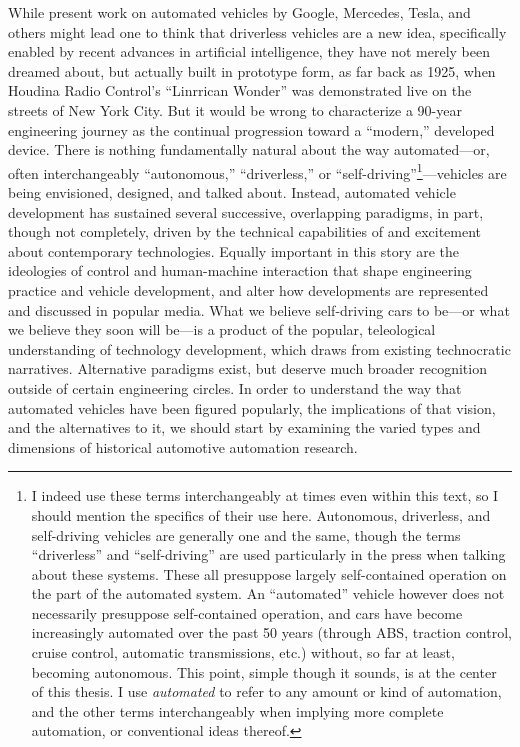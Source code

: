 While present work on automated vehicles by Google, Mercedes, Tesla,
and others might lead one to think that driverless vehicles are a
new idea, specifically enabled by recent advances in artificial
intelligence, they have not merely been dreamed about, but actually
built in prototype form, as far back as 1925, when Houdina Radio
Control's ``Linrrican Wonder'' was demonstrated
live on the streets of New York City. But it would be wrong to
characterize a 90-year engineering journey as the continual
progression toward a ``modern,'' developed device. There is nothing
fundamentally natural about the way automated---or, often interchangeably
``autonomous,'' ``driverless,'' or ``self-driving''\footnote{I indeed use these terms
  interchangeably at times even within this text, so I should mention
the specifics of their use here. Autonomous, driverless, and self-driving
vehicles are generally one and the same, though the terms
``driverless'' and
``self-driving'' are used particularly in the press when talking about
these systems. These all presuppose largely self-contained operation
on the part of the automated system. An ``automated'' vehicle however
does not necessarily presuppose self-contained operation, and cars
have become increasingly automated over the past 50 years (through
ABS, traction control, cruise control, automatic transmissions, etc.) without, so
far at least, becoming autonomous. This point, simple though it
sounds, is at the center of this thesis. I use \emph{automated} to refer to any amount
or kind of automation, and the other terms interchangeably when
implying more complete automation, or conventional ideas thereof.}---vehicles are being
envisioned, designed, and talked about. Instead, automated vehicle
development has sustained several successive, overlapping paradigms,
in part, though not completely, driven by the technical capabilities
of and excitement about contemporary technologies. Equally
important in this story are the ideologies of control and
human-machine interaction that shape engineering practice and vehicle 
development, and alter how developments are represented and discussed
in popular media. What we believe self-driving cars to be---or what we
believe they soon will be---is a product of the popular, teleological understanding
of technology development, which draws from existing technocratic
narratives. Alternative paradigms exist,
but deserve much broader recognition outside of certain engineering circles. In
order to understand the way that automated vehicles have been figured
popularly, the implications of that vision, and the alternatives to
it, we should start by examining the varied types and dimensions
of historical automotive automation research.


